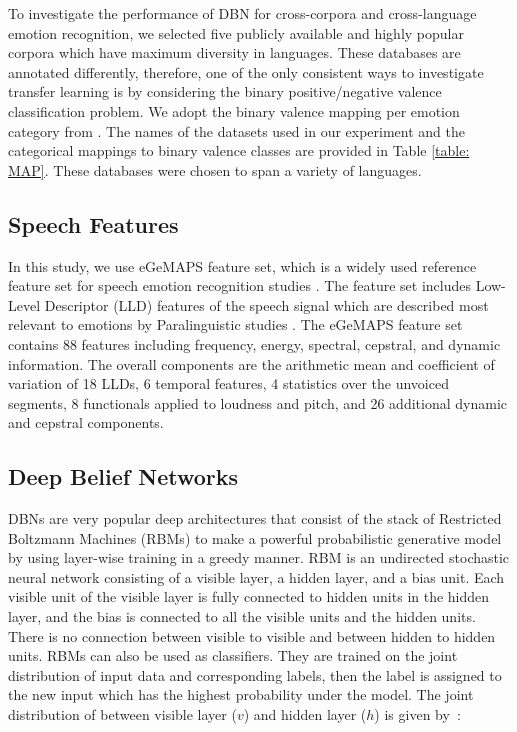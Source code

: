 \documentclass[a4paper]{article}
\newcommand*{\JE}[1]{\textcolor{magenta}{#1}}
\begin{document}
To investigate the performance of DBN for cross-corpora and cross-language emotion recognition, we selected five publicly available and highly popular corpora which have maximum diversity in languages. These databases are annotated differently, therefore, one of the only consistent ways to investigate transfer learning is by considering the binary positive/negative valence classification problem. We adopt the binary valence mapping per emotion category from \cite{deng2013sparse,eyben2016geneva,schuller2010cross}.  
The names of the datasets used in our experiment and the categorical mappings to binary valence classes are provided in Table \ref{table: MAP}. These databases were chosen to span a variety of languages. %

\subsection{Speech Features}

In this study, we use eGeMAPS feature set, which is a widely used reference feature set for speech emotion recognition studies \cite{gideon2017progressive}. 
The feature set includes Low-Level Descriptor (LLD) features of the speech signal which are described most relevant to emotions by Paralinguistic studies \cite{eyben2016geneva}. The eGeMAPS feature set contains 88 features including frequency, energy, spectral, cepstral, and dynamic information. The overall components are the arithmetic mean and coefficient of variation of 18 LLDs, 6 temporal features, 4 statistics over the unvoiced segments, 8 functionals applied to loudness and pitch, and 26 additional dynamic and cepstral components.

\subsection{Deep Belief Networks}
DBNs are very popular deep architectures that consist of the stack of Restricted Boltzmann Machines (RBMs) to make a powerful probabilistic generative model by using layer-wise training in a greedy manner. RBM is an undirected stochastic neural network consisting of a visible layer, a hidden layer, and a bias unit. Each visible unit of the visible layer is fully connected to hidden units in the hidden layer, and the bias is connected to all the visible units and the hidden units. There is no connection between visible to visible and between hidden to hidden units. RBMs can also be used as classifiers. They are trained on the joint distribution of input data and corresponding labels, then the label is assigned to the new input which has the highest probability under the model. The joint distribution of between visible layer ($v$) and hidden layer ($h$) is given by~\cite{hinton2006fast}: 
\end{document}
